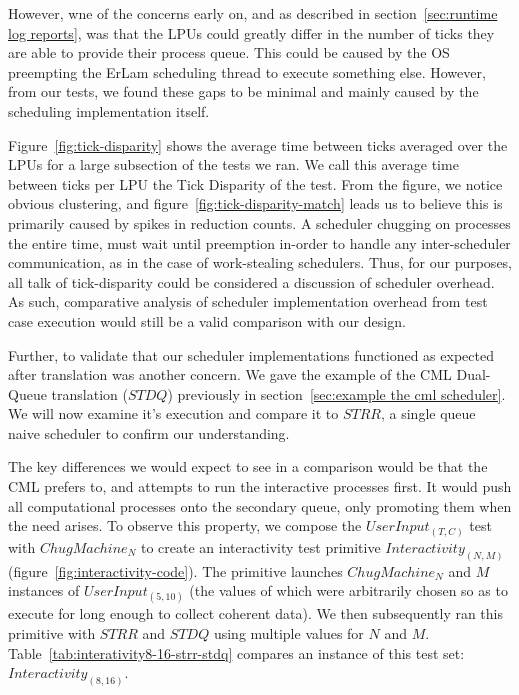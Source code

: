 However,
wne of the concerns early on, and as described in section~\ref{sec:runtime log reports}, 
was that the LPUs could greatly differ in the number of ticks they are able to 
provide their process queue. This could be caused by the OS preempting the 
ErLam scheduling thread to execute something else. However, from our tests, we
found these gaps to be minimal and mainly caused by the scheduling implementation
itself. 

Figure~\ref{fig:tick-disparity} shows the average time between ticks averaged over
the LPUs for a large subsection of the tests we ran. We call this average time 
between ticks per LPU the Tick Disparity of the test. From the figure, we notice
obvious clustering, and figure~\ref{fig:tick-disparity-match} leads us to believe this
is primarily caused by spikes in reduction counts. A scheduler chugging on 
processes the entire time, must wait until preemption in-order to handle any 
inter-scheduler communication, as in the case of work-stealing schedulers. Thus,
for our purposes, all talk of tick-disparity could be considered a discussion of
scheduler overhead. As such, comparative analysis of scheduler implementation 
overhead from test case execution would still be a valid comparison with our
design.

Further, to validate that our scheduler implementations functioned as expected 
after translation was another concern. We gave the example of the CML 
Dual-Queue translation ($STDQ$) previously in section~\ref{sec:example the cml scheduler}.
We will now examine it's execution and compare it to $STRR$, a single queue naive
scheduler to confirm our understanding.

The key differences we would expect to see in a comparison would be that the CML
prefers to, and attempts to run the interactive processes first. It would push
all computational processes onto the secondary queue, only promoting them when 
the need arises. To observe this property, we compose the $UserInput_{(T,C)}$ 
test with $ChugMachine_N$ to create an interactivity test primitive 
$Interactivity_{(N,M)}$ (figure~\ref{fig:interactivity-code}). The primitive
launches $ChugMachine_N$ and $M$ instances of $UserInput_{(5,10)}$ (the values
of which were arbitrarily chosen so as to execute for long enough to collect
coherent data). We then subsequently ran this primitive with $STRR$ and $STDQ$
using multiple values for $N$ and $M$. Table~\ref{tab:interativity8-16-strr-stdq}
compares an instance of this test set: $Interactivity_{(8,16)}$.


